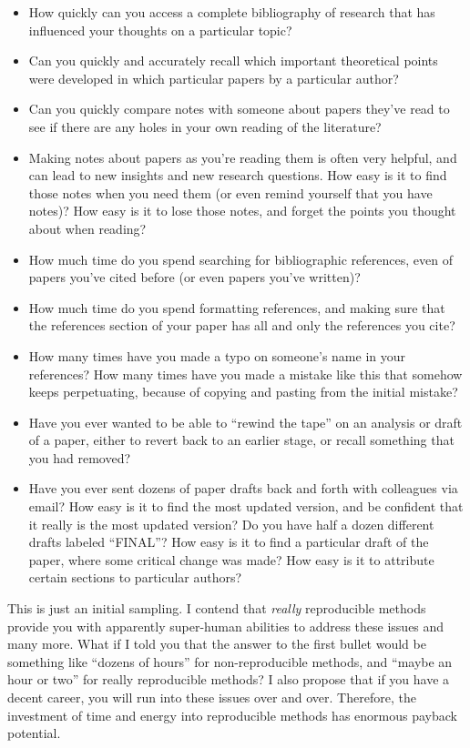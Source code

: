 \documentclass{book}
\begin{document}
\begin{itemize}
\item How quickly can you access a complete bibliography of research that has influenced your thoughts on a particular topic?
\item Can you quickly and accurately recall which important theoretical points were developed in which particular papers by a particular author?
\item Can you quickly compare notes with someone about papers they've read to see if there are any holes in your own reading of the literature?
\item Making notes about papers as you're reading them is often very helpful, and can lead to new insights and new research questions.  How easy is it to find those notes when you need them (or even remind yourself that you have notes)? How easy is it to lose those notes, and forget the points you thought about when reading?
\item How much time do you spend searching for bibliographic references, even of papers you've cited before (or even papers you've written)?
\item How much time do you spend formatting references, and making sure that the references section of your paper has all and only the references you cite?
\item How many times have you made a typo on someone's name in your references? How many times have you made a mistake like this that somehow keeps perpetuating, because of copying and pasting from the initial mistake?
\item Have you ever wanted to be able to ``rewind the tape'' on an analysis or draft of a paper, either to revert back to an earlier stage, or recall something that you had removed?
\item Have you ever sent dozens of paper drafts back and forth with colleagues via email? How easy is it to find the most updated version, and be confident that it really is the most updated version? Do you have half a dozen different drafts labeled ``FINAL''? How easy is it to find a particular draft of the paper, where some critical change was made? How easy is it to attribute certain sections to particular authors?
\end{itemize}

This is just an initial sampling. I contend that \emph{really} reproducible methods provide you with apparently super-human abilities to address these issues and many more. What if I told you that the answer to the first bullet would be something like ``dozens of hours'' for non-reproducible methods, and ``maybe an hour or two'' for really reproducible methods?  I also propose that if you have a decent career, you will run into these issues over and over. Therefore, the investment of time and energy into reproducible methods has enormous payback potential.
\end{document}
